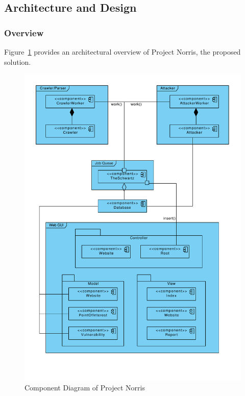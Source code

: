 \documentclass[12pt,a4paper]{article}
\begin{document}
\subsection{Architecture and Design}

\subsubsection{Overview}
Figure~\ref{fig:overview} provides an architectural overview of Project Norris, the proposed solution.

\begin{figure}[!ht]
    \begin{center}
        \includegraphics[scale=0.4]{images/overview_component_diagram.pdf}    
    \end{center}
    \caption{Component Diagram of Project Norris}
    \label{fig:overview}
\end{figure}
\end{document}
